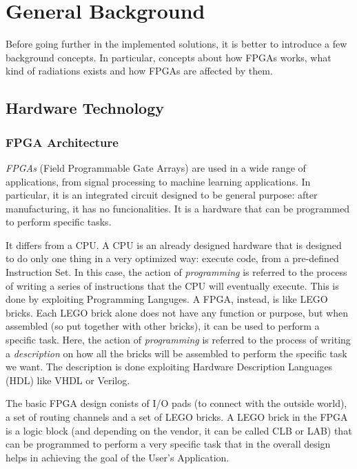 \nocite{doi:10.1063/1.5127719}

\chapter{General Background}
\label{sec:background}

Before going further in the implemented solutions, it is better to introduce a few background concepts. In particular, concepts about how FPGAs works, what kind of radiations exists and how FPGAs are affected by them.  

\section{Hardware Technology}

\subsection{FPGA Architecture}
\label{sec:fpgaarchitecture}
\textit{FPGAs} (Field Programmable Gate Arrays) are used in a wide range of applications, from signal processing to machine learning applications. In particular, it is an integrated circuit designed to be general purpose: after manufacturing, it has no funcionalities. It is a hardware that can be programmed to perform specific tasks. \bigskip

It differs from a CPU. A CPU is an already designed hardware that is designed to do only one thing in a very optimized way: execute code, from a pre-defined Instruction Set. In this case, the action of \textit{programming} is referred to the process of writing a series of instructions that the CPU will eventually execute. This is done by exploiting Programming Languges. A FPGA, instead, is like LEGO bricks. Each LEGO brick alone does not have any function or purpose, but when assembled (so put together with other bricks), it can be used to perform a specific task. Here, the action of \textit{programming} is referred to the process of writing a \textit{description} on how all the bricks will be assembled to perform the specific task we want. The description is done exploiting Hardware Description Languages (HDL) like VHDL or Verilog. \bigskip

The basic FPGA design conists of I/O pads (to connect with the outside world), a set of routing channels and a set of LEGO bricks. A LEGO brick in the FPGA is a logic block (and depending on the vendor, it can be called CLB or LAB) that can be programmed to perform a very specific task that in the overall design helps in achieving the goal of the User's Application. 

